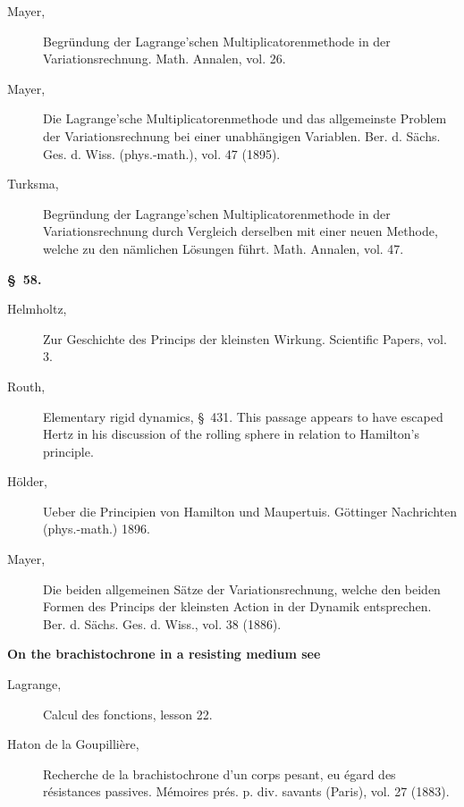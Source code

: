 \documentclass[11pt,a4paper,leqno]{article}
\begin{document}
\begin{description}
\item[Mayer,] Begründung der Lagrange'schen Multiplicatorenmethode in der
Variationsrechnung. Math. Annalen, vol. 26.

\item[Mayer,] Die Lagrange'sche Multiplicatorenmethode und das allgemeinste
Problem der Variationsrechnung bei einer unabhängigen Variablen. Ber. d.
Sächs. Ges. d. Wiss. (phys.-math.), vol. 47 (1895).

\item[Turksma,] Begründung der Lagrange'schen Multiplicatorenmethode in der
Variationsrechnung durch Vergleich derselben mit einer neuen Methode, welche
zu den nämlichen Lösungen führt. Math. Annalen, vol. 47.
\end{description}

\begin{center}{\bfseries \S~58.}\end{center}

\begin{description}
\item[Helmholtz,] Zur Geschichte des Princips der kleinsten Wirkung. Scientific
Papers, vol. 3.

\item[Routh,] Elementary rigid dynamics, \S~431. This passage appears to have
escaped Hertz in his discussion of the rolling sphere in relation to
Hamilton's principle.

\item[Hölder,] Ueber die Principien von Hamilton und Maupertuis. Göttinger
Nachrichten (phys.-math.) 1896.

\item[Mayer,] Die beiden allgemeinen Sätze der Variationsrechnung, welche den
beiden Formen des Princips der kleinsten Action in der Dynamik entsprechen.
Ber. d. Sächs. Ges. d. Wiss., vol. 38 (1886).
\end{description}

\begin{center}{\bfseries On the brachistochrone in a resisting medium see}\end{center}

\begin{description}
\item[Lagrange,] Calcul des fonctions, lesson 22.

\item[Haton de la Goupillière,] Recherche de la brachistochrone d'un corps
pesant, eu égard des résistances passives. Mémoires prés. p. div. savants
(Paris), vol. 27 (1883).
\end{description}
\end{document}
